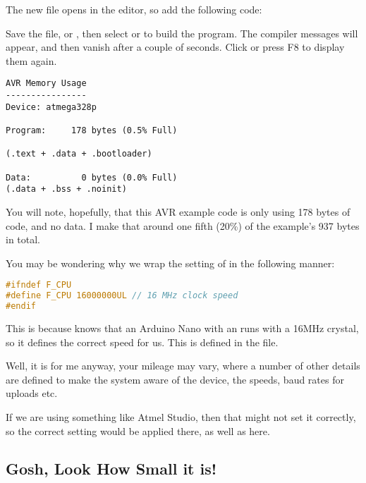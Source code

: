 The new file opens in the editor, so add the following  code:



Save the file,  or , then select  or  to build the program. The compiler messages will appear, and then vanish after a couple of seconds. Click  or press F8 to display them again.

\begin{lstlisting}[numbers={none},caption={AVR Blink Memory Usage}]
AVR Memory Usage
----------------
Device: atmega328p

Program:     178 bytes (0.5% Full)

(.text + .data + .bootloader)

Data:          0 bytes (0.0% Full)
(.data + .bss + .noinit)\end{lstlisting}

You will note, hopefully, that this AVR example code is only using 178 bytes of code, and no data. I make that around one fifth (20\%) of the   example's 937 bytes in total.

You may be wondering why we wrap the setting of  in the following manner:

\begin{lstlisting}[language=C,firstnumber=2,caption={Wrapping F\_CPU in AVRBlink.c}]
#ifndef F_CPU
#define F_CPU 16000000UL // 16 MHz clock speed
#endif
\end{lstlisting}

This is because  knows that an Arduino Nano with an  runs with a 16MHz crystal, so it defines the correct speed for us. This is defined in the  file.

Well, it is for me anyway, your mileage may vary, where a number of other details are defined to make the system aware of the device, the speeds, baud rates for uploads etc.

If we are using something like Atmel Studio, then that might not set it correctly, so the correct setting would be applied there, as well as here.

\subsection{Gosh, Look How Small it is!}\label{gosh-look-how-small-it-is}

